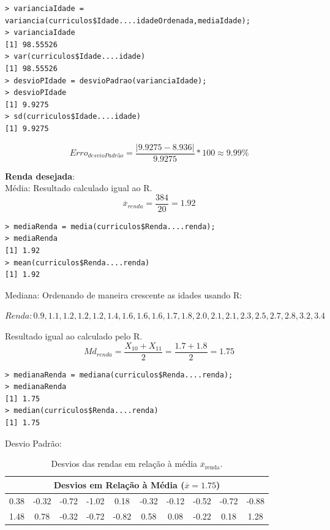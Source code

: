\documentclass[a4paper,11pt]{article}
\begin{document}
\begin{description}[leftmargin=*]
\begin{lstlisting}
> varianciaIdade = variancia(curriculos$Idade....idadeOrdenada,mediaIdade);
> varianciaIdade
[1] 98.55526
> var(curriculos$Idade....idade)
[1] 98.55526
> desvioPIdade = desvioPadrao(varianciaIdade);
> desvioPIdade
[1] 9.9275
> sd(curriculos$Idade....idade)
[1] 9.9275
\end{lstlisting}

\[Erro_{desvioPadrão} = \frac{|9.9275 - 8.936|}{9.9275} * 100  \approx  9.99\%\]



\item \textbf{Renda desejada}:\\
Média:
Resultado calculado igual ao R.
\[\overline{x}_{renda} = \frac{384}{20} = 1.92\]

\begin{lstlisting}
> mediaRenda = media(curriculos$Renda....renda);
> mediaRenda
[1] 1.92
> mean(curriculos$Renda....renda)
[1] 1.92
\end{lstlisting}

Mediana:
Ordenando de maneira crescente as idades usando R:

$Renda: 0.9, 1.1, 1.2, 1.2, 1.2, 1.4, 1.6, 1.6, 1.6, 1.7, 1.8, 2.0, 2.1, 2.1, 2.3, 2.5, 2.7, 2.8, 3.2, 3.4$

Resultado igual ao calculado pelo R.
\[Md_{renda} = \frac{X_{10}+X_{11}}{2} = \frac{1.7+1.8}{2} = 1.75\]

\begin{lstlisting}
> medianaRenda = mediana(curriculos$Renda....renda);
> medianaRenda
[1] 1.75
> median(curriculos$Renda....renda)
[1] 1.75
\end{lstlisting}

Desvio Padrão:

\begin{table}[H]
    \centering
    \begin{tabular}{cccccccccc}
        \hline
        \multicolumn{10}{c}{\textbf{Desvios em Relação à Média ($\overline{x} = 1.75$)}}\\
        \hline
        0.38 & -0.32 & -0.72 & -1.02 & 0.18 & -0.32 & -0.12 & -0.52 & -0.72 & -0.88 \\ 
         1.48 & 0.78 & -0.32 & -0.72 & -0.82 & 0.58 & 0.08 & -0.22 & 0.18 & 1.28 \\
        \hline
    \end{tabular}
    \caption{Desvios das rendas em relação à média $\overline{x}_{\text{renda}}$.}
    \label{tab:desvios_renda}
\end{table}


\end{description}
\end{document}
